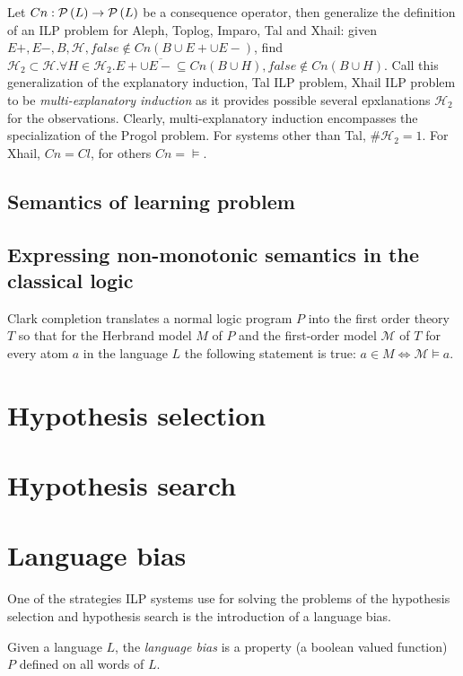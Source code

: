 Let $Cn:\mathcal{P} \left({ L }\right) \to \mathcal{P} \left({ L }\right)$ be a consequence operator, then generalize the definition of an ILP problem for Aleph, Toplog, Imparo, Tal and Xhail:
given $E+, E-, B, \mathcal{H}, false \not\in Cn(B \cup E+ \cup E-)$,
find $\mathcal{H}_2 \subset \mathcal{H}. \forall H \in \mathcal{H}_2. E+ \cup \overline{E-} \subseteq Cn(B \cup H), false \not\in Cn(B \cup H)$. Call this generalization of the explanatory induction, Tal ILP problem, Xhail ILP problem to be \emph{multi-explanatory induction} as it provides possible several epxlanations $\mathcal{H}_2$ for the observations. Clearly, multi-explanatory induction encompasses the specialization of the Progol problem. For systems other than Tal, $\#\mathcal{H}_2=1$. For Xhail, $Cn=Cl$, for others $Cn=\models$.

\subsection{Semantics of learning problem}
\subsection{Expressing non-monotonic semantics in the classical logic}
Clark completion translates a normal logic program $P$ into the first order theory $T$ so that for the Herbrand model $M$ of $P$ and the first-order model $\mathcal{M}$ of $T$ for every atom $a$ in the language $L$ the following statement is true:
$a \in M \iff \mathcal{M} \models a$.

\section{Hypothesis selection}

\section{Hypothesis search}

\section{Language bias}
One of the strategies ILP systems use for solving the problems of the hypothesis selection and hypothesis search is the introduction of a language bias.

\begin{defn}
Given a language $L$, the \emph{language bias} is a property (a boolean valued function) $P$ defined on all words of $L$.
\end{defn}

